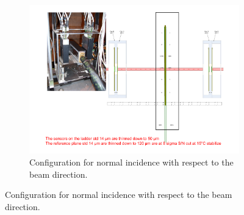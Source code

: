     \begin{figure}[!tbh]
      \centering
      \begin{subfigure}[t]{0.9\textwidth}
        \centering
        \includegraphics[width = 0.5 \textwidth]{Pictures/deformation/tb_cern_11_sketch_normal.pdf}
        \caption{Configuration for normal incidence with respect to the beam direction.}
        \label{fig:tbNormal}
      \end{subfigure}


\end{figure}
